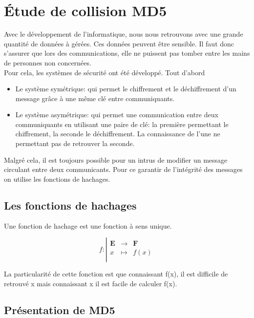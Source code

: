 \documentclass[a4paper,11pt,french]{article}
\begin{document}
\newpage
\section{\'Etude de collision MD5}

Avec le développement de l'informatique, nous nous retrouvons avec une grande quantité de données à gérées. Ces données peuvent \^etre sensible. Il faut donc s'assurer que lors des communications, elle ne puissent pas tomber entre les mains de personnes non concernées.\\

Pour cela, les systèmes de sécurité ont été développé. Tout d'abord \begin{itemize}
\item Le système symétrique: qui permet le chiffrement et le déchiffrement d'un message gr\^ace à une m\^eme clé  entre communiquants.
\item Le système asymétrique: qui permet une communication entre deux communiquants en utilisant une paire de clé: la première permettant le chiffrement, la seconde le déchiffrement. La connaissance de l'une ne permettant pas de retrouver la seconde.
\end{itemize}
\vspace{.5cm}
Malgré cela, il est toujours possible pour un intrus de modifier un message circulant entre deux communicants. Pour ce garantir de l'intégrité des messages on utilise les fonctions de hachages.

\subsection{Les fonctions de hachages}
Une fonction de hachage est une fonction à sens unique.

\begin{displaymath}
f:
\left|
  \begin{array}{rcl}
    \mathbf{E} & \longrightarrow &\mathbf{F} \\
    x & \longmapsto & f(x) \\
  \end{array}
\right.
\end{displaymath}

La particularité de cette fonction est que connaissant f(x), il est difficile de retrouvé x mais connaissant x il est facile de calculer f(x).

\subsection{Présentation de MD5}
\end{document}
